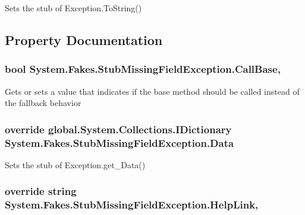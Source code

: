 Sets the stub of Exception.\-To\-String()



\subsection{Property Documentation}
\hypertarget{class_system_1_1_fakes_1_1_stub_missing_field_exception_abbbdfc059ade5333d6a9fc0d2d36ba8f}{
\subsubsection[{Call\-Base}]{\setlength{\rightskip}{0pt plus 5cm}bool System.\-Fakes.\-Stub\-Missing\-Field\-Exception.\-Call\-Base\hspace{0.3cm}{\ttfamily [get]}, {\ttfamily [set]}}}\label{class_system_1_1_fakes_1_1_stub_missing_field_exception_abbbdfc059ade5333d6a9fc0d2d36ba8f}


Gets or sets a value that indicates if the base method should be called instead of the fallback behavior

\hypertarget{class_system_1_1_fakes_1_1_stub_missing_field_exception_a01d27978968d2391a5d74e39481c5058}{
\subsubsection[{Data}]{\setlength{\rightskip}{0pt plus 5cm}override global.\-System.\-Collections.\-I\-Dictionary System.\-Fakes.\-Stub\-Missing\-Field\-Exception.\-Data\hspace{0.3cm}{\ttfamily [get]}}}\label{class_system_1_1_fakes_1_1_stub_missing_field_exception_a01d27978968d2391a5d74e39481c5058}


Sets the stub of Exception.\-get\-\_\-\-Data()

\hypertarget{class_system_1_1_fakes_1_1_stub_missing_field_exception_a82de737817fa39c080057e6aa7ddfea3}{
\subsubsection[{Help\-Link}]{\setlength{\rightskip}{0pt plus 5cm}override string System.\-Fakes.\-Stub\-Missing\-Field\-Exception.\-Help\-Link\hspace{0.3cm}{\ttfamily [get]}, {\ttfamily [set]}}}\label{class_system_1_1_fakes_1_1_stub_missing_field_exception_a82de737817fa39c080057e6aa7ddfea3}


